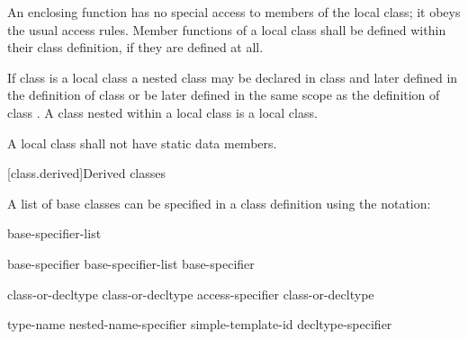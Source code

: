 \pnum
An enclosing function has no special access to members of the local
class; it obeys the usual access rules.
%
Member functions of a local class shall be defined within their class
definition, if they are defined at all.

\pnum
{}%
If class  is a local class a nested class  may be
declared in class  and later defined in the definition of class
 or be later defined in the same scope as the definition of
class .
%
A class nested within
a local class is a local class.

\pnum
{}%
A local class shall not have static data members.

[class.derived]{Derived classes}%


\pnum
{}%
%
%
A list of base classes can be specified in a class definition using
the notation:

\begin{bnf}
\br
    \terminal{:} base-specifier-list
\end{bnf}


\begin{bnf}
\br
    base-specifier \br
    base-specifier-list \terminal{,} base-specifier 
\end{bnf}

\begin{bnf}
\br
     class-or-decltype\br
       class-or-decltype\br
     access-specifier  class-or-decltype
\end{bnf}

\begin{bnf}
\br
     type-name\br
    nested-name-specifier  simple-template-id\br
    decltype-specifier
\end{bnf}

